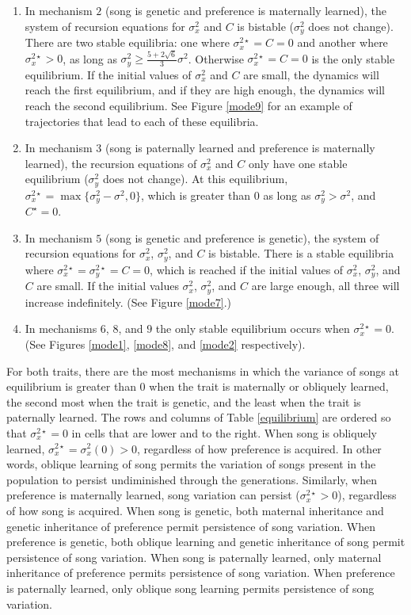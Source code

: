 \documentclass[12pt]{article}
\begin{document}
\begin{enumerate}
\item
In mechanism $2$ (song is genetic and preference is maternally learned), the system of recursion equations for $\sigma_x^2$ and $C$ is bistable ($\sigma_y^2$ does not change). There are two stable equilibria: one where $\sigma_x^{2\star}=C=0$ and another where $\sigma_x^{2\star}>0$, as long as $\sigma_y^2\geq\frac{5+2\sqrt{6}}{3}\sigma^2$. Otherwise $\sigma_x^{2\star}=C=0$ is the only stable equilibrium. If the initial values of $\sigma_x^2$ and $C$ are small, the dynamics will reach the first equilibrium, and if they are high enough, the dynamics will reach the second equilibrium. See Figure \ref{mode9} for an example of trajectories that lead to each of these equilibria. 
\item In mechanism $3$ (song is paternally learned and preference is maternally learned), the recursion equations of $\sigma_x^2$ and $C$ only have one stable equilibrium ($\sigma_y^2$ does not change). At this equilibrium, $\sigma_x^{2\star}=\max\{\sigma_y^2-\sigma^2,0\}$, which is greater than $0$ as long as $\sigma_y^2>\sigma^2$, and $C^\star=0$.
\item In mechanism $5$ (song is genetic and preference is genetic), the system of recursion equations for $\sigma_x^2$, $\sigma_y^2$, and $C$ is bistable. There is a stable equilibria where $\sigma_x^{2\star}=\sigma_y^{2\star}=C=0$, which is reached if the initial values of $\sigma_x^2$, $\sigma_y^2$, and $C$ are small. If the initial values $\sigma_x^2$, $\sigma_y^2$, and $C$ are large enough, all three will increase indefinitely. (See Figure \ref{mode7}.)
\item In mechanisms $6$, $8$, and $9$ the only stable equilibrium occurs when $\sigma_x^{2\star}=0$. (See Figures \ref{mode1}, \ref{mode8}, and \ref{mode2} respectively). 
\end{enumerate}

For both traits, there are the most mechanisms in which the variance of songs at equilibrium is greater than $0$ when the trait is maternally or obliquely learned, the second most when the trait is genetic, and the least when the trait is paternally learned. The rows and columns of Table \ref{equilibrium} are ordered so that $\sigma_x^{2\star}=0$ in cells that are lower and to the right. When song is obliquely learned, $\sigma_x^{2\star}=\sigma_x^2(0)>0$, regardless of how preference is acquired. In other words, oblique learning of song permits the variation of songs present in the population to persist undiminished through the generations. Similarly, when preference is maternally learned, song variation can persist ($\sigma_x^{2\star}>0$), regardless of how song is acquired.  When song is genetic, both maternal inheritance and genetic inheritance of preference permit persistence of song variation. When preference is genetic, both oblique learning and genetic inheritance of song permit persistence of song variation.  When song is paternally learned, only maternal inheritance of preference permits persistence of song variation. When preference is paternally learned, only oblique song learning permits persistence of song variation.  
\end{document}
